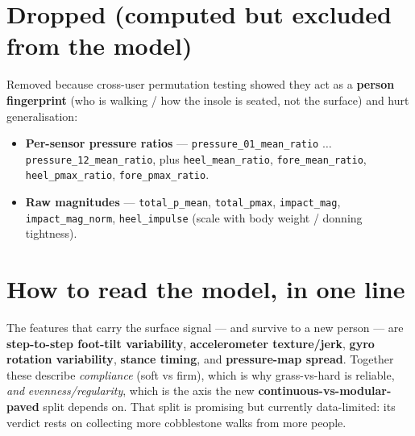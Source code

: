 \documentclass[11pt]{article}
\begin{document}
\section{Dropped (computed but excluded from the model)}
Removed because cross-user permutation testing showed they act as a \textbf{person fingerprint}
(who is walking / how the insole is seated, not the surface) and hurt generalisation:
\begin{itemize}
\item \textbf{Per-sensor pressure ratios} --- \texttt{pressure\_01\_mean\_ratio} $\ldots$ \texttt{pressure\_12\_mean\_ratio}, plus \texttt{heel\_mean\_ratio}, \texttt{fore\_mean\_ratio}, \texttt{heel\_pmax\_ratio}, \texttt{fore\_pmax\_ratio}.
\item \textbf{Raw magnitudes} --- \texttt{total\_p\_mean}, \texttt{total\_pmax}, \texttt{impact\_mag}, \texttt{impact\_mag\_norm}, \texttt{heel\_impulse} (scale with body weight / donning tightness).
\end{itemize}

\section*{How to read the model, in one line}
The features that carry the surface signal --- and survive to a new person --- are
\textbf{step-to-step foot-tilt variability}, \textbf{accelerometer texture/jerk}, \textbf{gyro
rotation variability}, \textbf{stance timing}, and \textbf{pressure-map spread}. Together these
describe \emph{compliance} (soft vs firm), which is why grass-vs-hard is reliable, \emph{and}
\emph{evenness/regularity}, which is the axis the new \textbf{continuous-vs-modular-paved} split
depends on. That split is promising but currently data-limited: its verdict rests on collecting
more cobblestone walks from more people.
\end{document}

